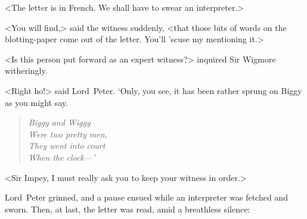 <The letter is in French. We shall have to swear an interpreter.>

<You will find,> said the witness suddenly, <that those bits of words on the blotting-paper come out of the letter. You'll 'scuse my mentioning it.>

<Is this person put forward as an expert witness?> inquired Sir Wigmore witheringly.

<Right ho!> said Lord~Peter. `Only, you see, it has been rather sprung on Biggy as you might say.

\begin{quote}\itshape
Biggy and Wiggy\\
Were two pretty men,\\
They went into court\\
When the clock—'
\end{quote}

<Sir Impey, I must really ask you to keep your witness in order.>

Lord~Peter grinned, and a pause ensued while an interpreter was fetched and sworn. Then, at last, the letter was read, amid a breathless silence:

